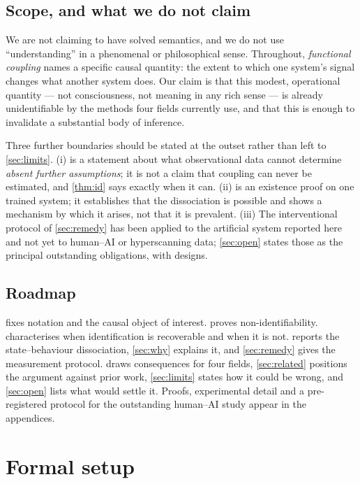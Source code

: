 \documentclass[11pt,a4paper]{article}
\theoremstyle{plain}
\theoremstyle{definition}
\theoremstyle{remark}
\begin{document}
\subsection{Scope, and what we do not claim}\label{sec:scope}

We are not claiming to have solved semantics, and we do not use ``understanding'' in a
phenomenal or philosophical sense. Throughout, \emph{functional coupling} names a specific
causal quantity: the extent to which one system's signal changes what another system does.
Our claim is that this modest, operational quantity --- not consciousness, not meaning in
any rich sense --- is already unidentifiable by the methods four fields currently use, and
that this is enough to invalidate a substantial body of inference.

Three further boundaries should be stated at the outset rather than left to
\cref{sec:limits}. (i)  is a statement about what observational data cannot
determine \emph{absent further assumptions}; it is not a claim that coupling can never be
estimated, and \cref{thm:id} says exactly when it can. (ii)  is an existence
proof on one trained system; it establishes that the dissociation is possible and shows a
mechanism by which it arises, not that it is prevalent. (iii) The interventional protocol of
\cref{sec:remedy} has been applied to the artificial system reported here and not yet to
human--AI or hyperscanning data; \cref{sec:open} states those as the principal outstanding
obligations, with designs.

\subsection{Roadmap}
 fixes notation and the causal object of interest.  proves
non-identifiability.  characterises when identification is
recoverable and when it is not.  reports the state--behaviour
dissociation, \cref{sec:why} explains it, and \cref{sec:remedy} gives the measurement
protocol.  draws consequences for four fields, \cref{sec:related}
positions the argument against prior work, \cref{sec:limits} states how it could be wrong,
and \cref{sec:open} lists what would settle it. Proofs, experimental detail and a
pre-registered protocol for the outstanding human--AI study appear in the appendices.

\section{Formal setup}\label{sec:setup}
\end{document}

